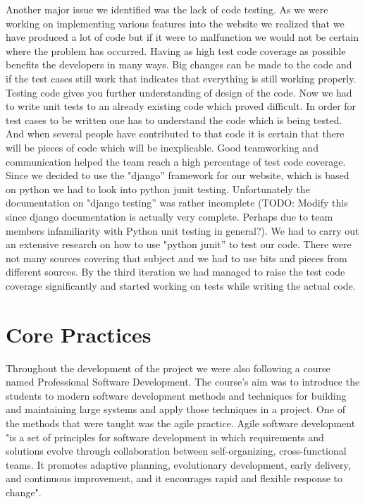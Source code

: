 \documentclass{l3proj}
\begin{document}
Another major issue we identified was the lack of code testing. As we were working on implementing various features into the website
we realized that we have produced a lot of code but if it were to malfunction we would not be certain where the problem has occurred.
Having as high test code coverage as possible benefits the developers in many ways. Big changes can be made to the code and if
the test cases still work that indicates that everything is still working properly. Testing code gives you further understanding of
design of the code. Now we had to write unit tests to an already existing code which proved difficult. In order for test cases to
be written one has to understand the code which is being tested. And when several people have contributed to that code it is certain
that there will be pieces of code which will be inexplicable. Good teamworking and communication helped the team reach a high percentage
of test code coverage. Since we decided to use the "django'' framework for our website, which is based on python we had to look into
python junit testing. Unfortunately the documentation on "django testing'' was rather incomplete (TODO: Modify this since django documentation
is actually very complete. Perhaps due to team members infamiliarity with Python unit testing in general?). We had to carry out an extensive research
on how to use "python junit'' to test our code. There were not many sources covering that subject and we had to use bits and pieces from
different sources. By the third iteration we had managed to raise the test code coverage significantly and started working on tests
while writing the actual code.

\section{Core Practices}
\label {sec:core-practices}

Throughout the development of the project we were also following a course named Professional Software Development.
The course's aim was to introduce the students to modern software development methods and techniques for building and
maintaining large systems and apply those techniques in a project. One of the methods that were taught
was the agile practice. Agile software development "is a set of principles for software development in
which requirements and solutions evolve through collaboration between self-organizing, cross-functional teams.
It promotes adaptive planning, evolutionary development, early delivery, and continuous improvement, and it encourages
rapid and flexible response to change".
\end{document}
